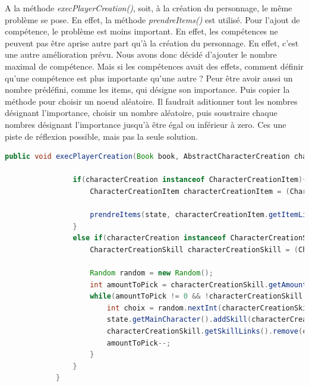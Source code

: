 		A la méthode \textit{execPlayerCreation()}, soit, à la création du personnage, le même problème se pose. En effet, la méthode \textit{prendreItems()} est utilisé. Pour l'ajout de compétence, le problème est moins important. En effet, les compétences ne peuvent pas être aprise autre part qu'à la création du personnage. En effet, c'est une autre amélioration prévu. Nous avons donc décidé d'ajouter le nombre maximal de compétence. Mais si les compétences avait des effets, comment définir qu'une compétence est plus importante qu'une autre ? Peur être avoir aussi un nombre prédéfini, comme les items, qui désigne son importance. Puis copier la méthode pour choisir un noeud aléatoire. Il faudrait aditionner tout les nombres désignant l'importance, choisir un nombre aléatoire, puis soustraire chaque nombres désignant l'importance jusqu'à être égal ou inférieur à zero. Ces une piste de réflexion possible, mais pas la seule solution.

		\begin{lstlisting}[gobble=12, language=java, caption=execPlayerCreation() de Fourmis]
			public void execPlayerCreation(Book book, AbstractCharacterCreation characterCreation, BookState state) {

				if(characterCreation instanceof CharacterCreationItem){
					CharacterCreationItem characterCreationItem = (CharacterCreationItem) characterCreation;

					prendreItems(state, characterCreationItem.getItemLinks(), characterCreationItem.getAmountToPick());
				}
				else if(characterCreation instanceof CharacterCreationSkill){
					CharacterCreationSkill characterCreationSkill = (CharacterCreationSkill) characterCreation;

					Random random = new Random();
					int amountToPick = characterCreationSkill.getAmountToPick();
					while(amountToPick != 0 && !characterCreationSkill.getSkillLinks().isEmpty()) {
						int choix = random.nextInt(characterCreationSkill.getSkillLinks().size());
						state.getMainCharacter().addSkill(characterCreationSkill.getSkillLinks().get(choix));
						characterCreationSkill.getSkillLinks().remove(choix);
						amountToPick--;
					}
				}
			}
		\end{lstlisting}

